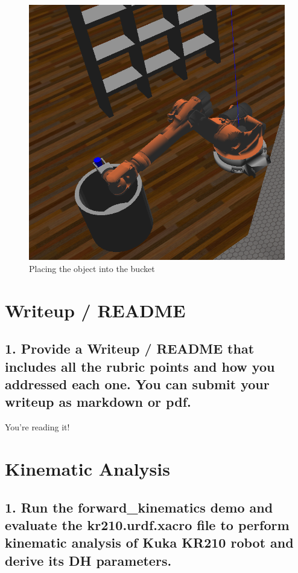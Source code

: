 \documentclass{article}
\begin{document}
\begin{figure}[H]
    \includegraphics[width=\linewidth]{KR210Action1.png}
    \caption{Placing the object into the bucket}
    \label{fig:action1}
\end{figure}

\section{Writeup / README}

\subsection{1. Provide a Writeup / README that includes all the rubric points and how you addressed each one.  You can submit your writeup as markdown or pdf.}

You're reading it!

\section{Kinematic Analysis}
\subsection{1. Run the forward\_kinematics demo and evaluate the kr210.urdf.xacro file to perform kinematic analysis of Kuka KR210 robot and derive its DH parameters.}
\end{document}
